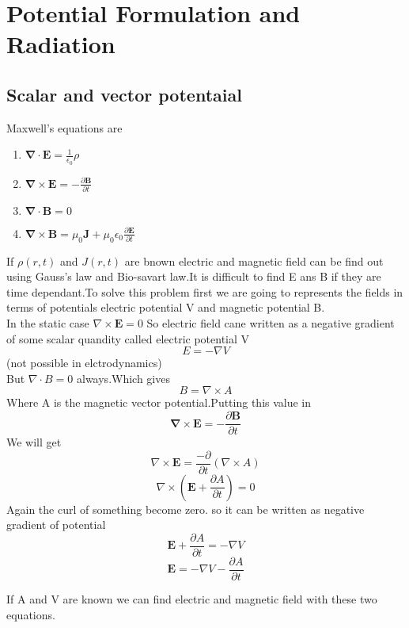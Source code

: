 \chapter{Potential Formulation and Radiation}
\section{Scalar and vector potentaial}
Maxwell's equations are
\begin{enumerate}[label=(\roman*)]
	\item $\boldsymbol{\nabla} \cdot \mathbf{E}=\frac{1}{\epsilon_{0}} \rho$
	\item $\boldsymbol{\nabla} \times \mathbf{E}=-\frac{\partial \mathbf{B}}{\partial t}$
	\item $\boldsymbol{\nabla} \cdot \mathbf{B}=0$
	\item $\boldsymbol{\nabla} \times \mathbf{B}=\mu_{0} \mathbf{J}+\mu_{0} \epsilon_{0} \frac{\partial \mathbf{E}}{\partial t}$
\end{enumerate}
If $\rho(r,t)$ and $J(r,t)$ are bnown electric and magnetic field can be find out using Gauss's law and Bio-savart law.It is difficult to find E ans B if they are time dependant.To solve this problem first we are going to represents the fields in terms of potentials electric potential V and magnetic potential B.\\
In the static case $\nabla \times \mathbf{E}=0$ So electric field cane written as a negative gradient of some scalar quandity called electric potential V\\
$$E=-\nabla V$$(not possible in elctrodynamics)\\
But $\nabla \cdot B=0$ always.Which gives \\
$$B=\nabla\times A$$
 Where A is the magnetic vector potential.Putting this value in 
$$\boldsymbol{\nabla} \times \mathbf{E}=-\frac{\partial \mathbf{B}}{\partial t}$$
We will get \\
$$\nabla \times \mathbf{E}=\frac{-\partial }{\partial t}(\nabla \times A)$$
$$\nabla \times \left( \mathbf{E}+\frac{\partial A}{\partial t}\right) =0$$
Again the curl of something become zero. so it can be written as negative gradient of potential
$$\mathbf{E}+\frac{\partial A}{\partial t}=-\nabla V$$
$$\mathbf{E}=-\nabla V-\frac{\partial A}{\partial t}$$
\begin{center}
\end{center}
If A and V are known we can find electric and magnetic field with these two equations.

